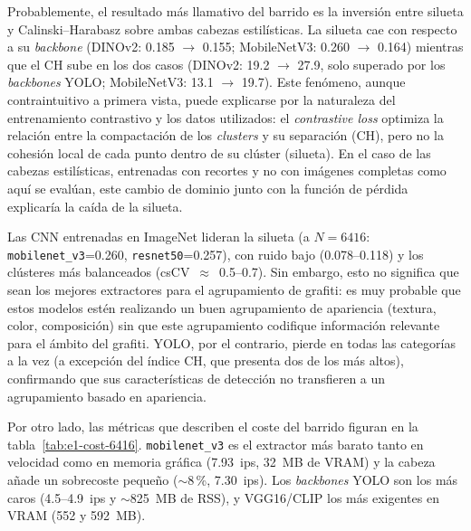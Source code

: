 Probablemente, el resultado más llamativo del barrido es la inversión entre
silueta y Calinski--Harabasz sobre ambas cabezas estilísticas. La silueta cae
con respecto a su \textit{backbone} (DINOv2: 0.185 \(\to\) 0.155; MobileNetV3:
0.260 \(\to\) 0.164) mientras que el CH sube en los dos casos (DINOv2: 19.2
\(\to\) 27.9, solo superado por los \textit{backbones} YOLO; MobileNetV3: 13.1
\(\to\) 19.7). Este fenómeno, aunque contraintuitivo a primera vista, puede
explicarse por la naturaleza del entrenamiento contrastivo y los datos
utilizados: el \textit{contrastive loss} optimiza la relación entre la
compactación de los \textit{clusters} y su separación (CH), pero no la cohesión
local de cada punto dentro de su clúster (silueta). En el caso de las cabezas
estilísticas, entrenadas con recortes y no con imágenes completas como aquí se
evalúan, este cambio de dominio  junto con la función de pérdida explicaría la
caída de la silueta.

Las CNN entrenadas en ImageNet lideran la silueta (a $N=6416$:
\texttt{mobilenet\_v3}=0.260, \texttt{resnet50}=0.257), con ruido bajo
(0.078--0.118) y los clústeres más balanceados (csCV~$\approx$~0.5--0.7). Sin
embargo, esto no significa que sean los mejores extractores para el
agrupamiento de grafiti: es muy probable que estos modelos estén realizando un
buen agrupamiento de apariencia (textura, color, composición) sin que este
agrupamiento codifique información relevante para el ámbito del grafiti. YOLO,
por el contrario, pierde en todas las categorías a la vez (a excepción del
índice CH, que presenta dos de los más altos), confirmando que sus
características de detección no transfieren a un agrupamiento basado en
apariencia.

Por otro lado, las métricas que describen el coste del barrido figuran en la
tabla~\ref{tab:e1-cost-6416}. \texttt{mobilenet\_v3} es el extractor más barato
tanto en velocidad como en memoria gráfica (7.93~ips, 32~MB de VRAM) y la
cabeza añade un sobrecoste pequeño ($\sim$8\,\%, 7.30~ips). Los
\textit{backbones} YOLO son los más caros (4.5--4.9~ips y $\sim$825~MB de RSS),
y VGG16/CLIP los más exigentes en VRAM (552 y 592~MB).

